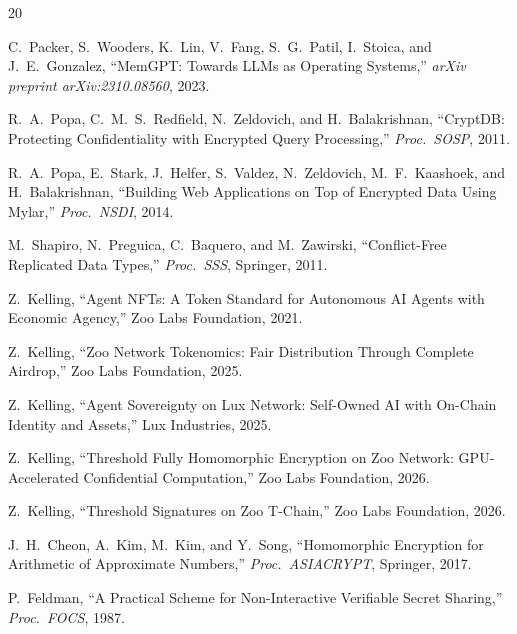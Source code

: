 \begin{thebibliography}{20}

C.~Packer, S.~Wooders, K.~Lin, V.~Fang, S.~G.~Patil, I.~Stoica, and J.~E.~Gonzalez,
``MemGPT: Towards LLMs as Operating Systems,''
\textit{arXiv preprint arXiv:2310.08560}, 2023.

R.~A.~Popa, C.~M.~S.~Redfield, N.~Zeldovich, and H.~Balakrishnan,
``CryptDB: Protecting Confidentiality with Encrypted Query Processing,''
\textit{Proc.\ SOSP}, 2011.

R.~A.~Popa, E.~Stark, J.~Helfer, S.~Valdez, N.~Zeldovich, M.~F.~Kaashoek, and H.~Balakrishnan,
``Building Web Applications on Top of Encrypted Data Using Mylar,''
\textit{Proc.\ NSDI}, 2014.

M.~Shapiro, N.~Preguica, C.~Baquero, and M.~Zawirski,
``Conflict-Free Replicated Data Types,''
\textit{Proc.\ SSS}, Springer, 2011.

Z.~Kelling,
``Agent NFTs: A Token Standard for Autonomous AI Agents with Economic Agency,''
Zoo Labs Foundation, 2021.

Z.~Kelling,
``Zoo Network Tokenomics: Fair Distribution Through Complete Airdrop,''
Zoo Labs Foundation, 2025.

Z.~Kelling,
``Agent Sovereignty on Lux Network: Self-Owned AI with On-Chain Identity and Assets,''
Lux Industries, 2025.

Z.~Kelling,
``Threshold Fully Homomorphic Encryption on Zoo Network: GPU-Accelerated Confidential Computation,''
Zoo Labs Foundation, 2026.

Z.~Kelling,
``Threshold Signatures on Zoo T-Chain,''
Zoo Labs Foundation, 2026.

J.~H.~Cheon, A.~Kim, M.~Kim, and Y.~Song,
``Homomorphic Encryption for Arithmetic of Approximate Numbers,''
\textit{Proc.\ ASIACRYPT}, Springer, 2017.

P.~Feldman,
``A Practical Scheme for Non-Interactive Verifiable Secret Sharing,''
\textit{Proc.\ FOCS}, 1987.

\end{thebibliography}

